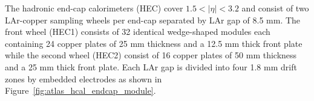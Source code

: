 The hadronic end-cap calorimeters (HEC) cover $1.5 < |\eta| < 3.2$ and consist of two LAr-copper sampling wheels per end-cap separated by LAr gap of 8.5 mm.  The front wheel (HEC1) consists of 32 identical wedge-shaped modules each containing 24 copper plates of 25 mm thickness and a 12.5 mm thick front plate while the second wheel (HEC2) consist of 16 copper plates of 50 mm thickness and a 25 mm thick front plate. Each LAr gap is divided into four 1.8 mm drift zones by embedded electrodes as shown in Figure~\ref{fig:atlas_hcal_endcap_module}.
